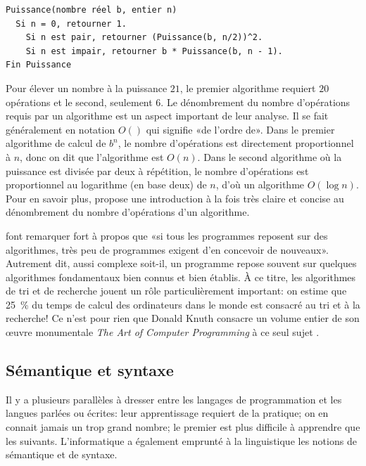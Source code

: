 \begin{Schunk}
\begin{Verbatim}
Puissance(nombre réel b, entier n)
  Si n = 0, retourner 1.
    Si n est pair, retourner (Puissance(b, n/2))^2.
    Si n est impair, retourner b * Puissance(b, n - 1).
Fin Puissance
\end{Verbatim}
\end{Schunk}

Pour élever un nombre à la puissance $21$, le premier algorithme
requiert $20$ opérations et le second, seulement $6$. Le dénombrement
du nombre d'opérations requis par un algorithme est un aspect
important de leur analyse. Il se fait généralement en notation $O()$
qui signifie «de l'ordre de». Dans le premier algorithme de calcul de
$b^n$, le nombre d'opérations est directement proportionnel à $n$,
donc on dit que l'algorithme est $O(n)$. Dans le second algorithme où
la puissance est divisée par deux à répétition, le nombre d'opérations
est proportionnel au logarithme (en base deux) de $n$, d'où un
algorithme $O(\log n)$. Pour en savoir plus,
\citet[chapitre~1]{Stephens:algorithms:2013} propose une introduction
à la fois très claire et concise au dénombrement du nombre
d'opérations d'un algorithme.

\citet{Kernighan:practice:1999} font remarquer fort à propos que «si
tous les programmes reposent sur des algorithmes, très peu de
programmes exigent d'en concevoir de nouveaux». Autrement dit, aussi
complexe soit-il, un programme repose souvent sur quelques algorithmes
fondamentaux bien connus et bien établis. À ce titre, les algorithmes
de tri et de recherche jouent un rôle particulièrement important: on
estime que 25~\% du temps de calcul des ordinateurs dans le monde est
consacré au tri et à la recherche! Ce n'est pour rien que Donald Knuth
consacre un volume entier de son œuvre monumentale \emph{The Art of
  Computer Programming} à ce seul sujet \citep{Knuth:ACP:vol1:1997}.


\subsection{Sémantique et syntaxe}
\label{sec:informatique:concepts:semantique}

Il y a plusieurs parallèles à dresser entre les langages de
programmation et les langues parlées ou écrites: leur apprentissage
requiert de la pratique; on en connait jamais un trop grand nombre; le
premier est plus difficile à apprendre que les suivants.
L'informatique a également emprunté à la linguistique les notions de
sémantique et de syntaxe.

